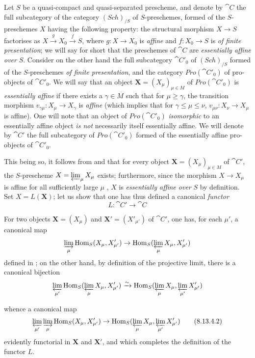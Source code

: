 \begin{env}[8.13.4]
\label{IV.8.13.4}
Let $S$ be a quasi-compact and quasi-separated prescheme, and denote by $\cat{C}$ the full subcategory of the category $(\boldsymbol{\mathit{Sch}})_{/S}$ of $S$-preschemes, formed of the $S$-preschemes $X$ having the following property: the structural morphism $X\to S$ factorises as $X\xrightarrow{g}X_0\xrightarrow{f}S$, where $g:X\to X_0$ is \emph{affine} and $f:X_0\to S$ is \emph{of finite presentation}; we will say for short that the preschemes of $\cat{C}$ are \emph{essentially affine over} $S$.
Consider on the other hand the full subcategory $\cat{C}'_0$ of $(\boldsymbol{\mathit{Sch}})_{/S}$ formed of the $S$-preschemes \emph{of finite presentation}, and the category $\boldsymbol{\mathit{Pro}}(\cat{C}'_0)$ of pro-objects of $\cat{C}'_0$.
We will say that an object $\mathbf{X}=(X_\mu)_{\mu\in M}$ of $\boldsymbol{\mathit{Pro}}(\cat{C}'_0)$ is \emph{essentially affine} if there exists a $\gamma\in M$ such that for $\mu\geqslant\gamma$, the transition morphism $v_{\gamma\mu}:X_\mu\to X_\gamma$ is \emph{affine} (which implies that for $\gamma\leqslant\mu\leqslant\nu$, $v_{\mu\nu}:X_\nu\to X_\mu$ is affine).
One will note that an object of $\boldsymbol{\mathit{Pro}}(\cat{C}'_0)$ \emph{isomorphic} to an essentially affine object \emph{is not} necessarily itself essentially affine.
We will denote by $\cat{C}'$ the full subcategory of $\boldsymbol{\mathit{Pro}}(\cat{C}'_0)$ formed of the essentially affine pro-objects of $\cat{C}'_0$.

This being so, it follows from  and  that for every object $\mathbf{X}=(X_\mu)_{\mu\in M}$ of $\cat{C}'$, the $S$-prescheme $X=\varprojlim_\mu X_\mu$ exists; furthermore, since the morphism $X\to X_\mu$ is affine for all sufficiently large $\mu$ , $X$ is \emph{essentially affine over} $S$ by definition.
Set $X=L(\mathbf{X})$; let us show that one has thus defined a canonical \emph{functor}
\begin{equation}
\label{IV.8.13.4.1}
L:\cat{C}'\to\cat{C} \tag{8.13.4.1}
\end{equation}

For two objects $\mathbf{X}=(X_\mu)$ and $\mathbf{X}'=(X'_{\mu'})$ of $\cat{C}'$, one has, for each $\mu'$, a canonical map
\[
\varinjlim_\mu\operatorname{Hom}_S(X_\mu,X'_{\mu'})\to\operatorname{Hom}_S(\varprojlim_\mu X_\mu,X'_{\mu'})
\]
defined in ; on the other hand, by definition of the projective limit, there is a canonical bijection
\[
\varprojlim_{\mu'}\operatorname{Hom}_S(\varprojlim_\mu X_\mu,X'_{\mu'})\xrightarrow{\sim}\operatorname{Hom}_S(\varprojlim_\mu X_\mu,\varprojlim_{\mu'}X'_{\mu'})
\]

whence a canonical map
\begin{equation}
\label{IV.8.13.4.2}
\varprojlim_{\mu'}\varinjlim_\mu\operatorname{Hom}_S(X_\mu,X'_{\mu'})\to\operatorname{Hom}_S(\varprojlim_\mu X_\mu,\varprojlim_{\mu'}X'_{\mu'}) \tag{8.13.4.2}
\end{equation}
evidently functorial in $\mathbf{X}$ and $\mathbf{X}'$, and which completes the definition of the functor $L$.
\end{env}

